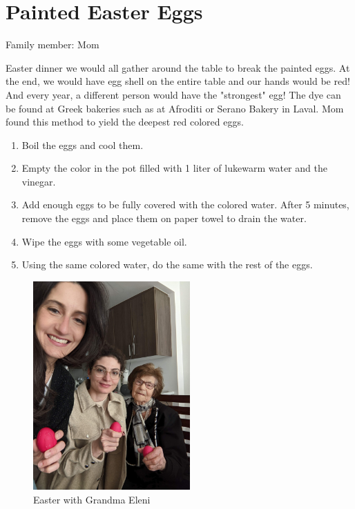 \chapter{Painted Easter Eggs}
\label{ch:eastereggs}


Family member: Mom

 Easter dinner we would all gather around the table to break the painted eggs. At the end, we would have egg shell on the entire table and our hands would be red! And every year, a different person would have the "strongest" egg!     The dye can be found at Greek bakeries such as at Afroditi or Serano Bakery in Laval. Mom found this method to yield the deepest red colored eggs.

\begin{enumerate}
    \item Boil the eggs and cool them.
    \item Empty the color in the pot filled with 1 liter of lukewarm water and the vinegar.
    \item Add enough eggs to be fully covered with the colored water. After 5 minutes, remove the eggs and place them on paper towel to drain the water.
    \item Wipe the eggs with some vegetable oil.
    \item Using the same colored water, do the same with the rest of the eggs. 
\end{enumerate}

\begin{figure}
  \includegraphics[width=60mm]{monanteras/images/Easter eggs with grandma.jpg}
  \caption{Easter with Grandma Eleni}
\end{figure}

